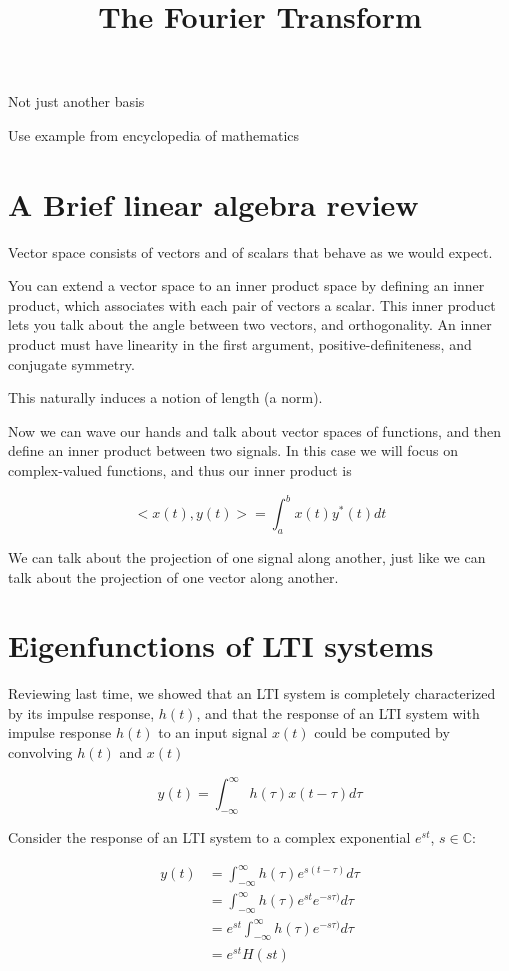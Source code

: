 

\title{The Fourier Transform}

\maketitle

\listoffixmes

Not just another basis

Use example from encyclopedia of mathematics
\section{A Brief linear algebra review}
Vector space consists of vectors and of scalars that behave as we would expect. 

You can extend a vector space to an inner product space by defining an 
inner product, which associates with each pair of vectors a scalar. This
inner product lets you talk about the angle between two vectors,
and orthogonality. An inner product must have linearity in the first
argument, positive-definiteness, and conjugate symmetry. 

This naturally induces a notion of length (a norm). 

Now we can wave our hands and talk about vector spaces of functions, 
and then define an inner product between two signals. In this case
we will focus on complex-valued functions, and thus our inner product is

\[
<x(t), y(t)> = \int_a^b x(t) y^*(t) dt
\]

We can talk about the projection of one signal along another, just like
we can talk about the projection of one vector along another. 


\section{Eigenfunctions of LTI systems}
Reviewing last time, we showed that an LTI system is completely
characterized by its impulse response, $h(t)$, and that the
response of an LTI system with impulse response $h(t)$ to an
input signal $x(t)$ could be computed by convolving $h(t)$ and $x(t)$

\[
y(t) = \int_{-\infty}^{\infty}h(\tau) x(t-\tau) d\tau
\]

Consider the response of an LTI system to a complex exponential $e^{st}$, 
$s \in \mathbb{C}$:

\begin{align}
y(t) &=  \int_{-\infty}^{\infty}h(\tau) e^{s(t-\tau)} d\tau \\
     &=  \int_{-\infty}^{\infty}h(\tau) e^{st}e^{-s\tau)} d\tau \\
     &=  e^{st}\int_{-\infty}^{\infty}h(\tau) e^{-s\tau)} d\tau \\
     &= e^{st}H(st)\\
\end{align}

